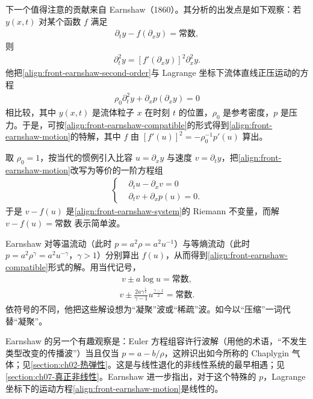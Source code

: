 \documentclass[../../main.tex]{subfiles}
\begin{document}
下一个值得注意的贡献来自 Earnshaw（1860）。其分析的出发点是如下观察：若 $y(x,t)$ 对某个函数 $f$ 满足
\begin{align}
\partial_t y-f(\partial_x y)=\text{常数},\label{align:front-earnshaw-compatible}
\end{align}
则
\begin{align}
\partial_t^{2}y=[f'(\partial_x y)]^{2}\partial_x^{2}y.\label{align:front-earnshaw-second-order}
\end{align}
他把\eqref{align:front-earnshaw-second-order}与 Lagrange 坐标下流体直线正压运动的方程
\begin{align}
\rho_0\partial_t^{2}y+\partial_x p(\partial_x y)=0\label{align:front-earnshaw-motion}
\end{align}
相比较，其中 $y(x,t)$ 是流体粒子 $x$ 在时刻 $t$ 的位置，$\rho_0$ 是参考密度，$p$ 是压力。于是，可按\eqref{align:front-earnshaw-compatible}的形式得到\eqref{align:front-earnshaw-motion}的特解，其中 $f$ 由 $[f'(u)]^{2}=-\rho_0^{-1}p'(u)$ 算出。

取 $\rho_0=1$，按当代的惯例引入比容 $u=\partial_x y$ 与速度 $v=\partial_t y$，把\eqref{align:front-earnshaw-motion}改写为等价的一阶方程组
\begin{align}
\left\{\begin{aligned}
&\partial_t u-\partial_x v=0\\
&\partial_t v+\partial_x p(u)=0.
\end{aligned}\right.\label{align:front-earnshaw-system}
\end{align}
于是 $v-f(u)$ 是\eqref{align:front-earnshaw-system}的 Riemann 不变量，而解 $v-f(u)=\text{常数}$ 表示简单波。

Earnshaw 对等温流动（此时 $p=a^{2}\rho=a^{2}u^{-1}$）与等熵流动（此时 $p=a^{2}\rho^{\gamma}=a^{2}u^{-\gamma}$，$\gamma>1$）分别算出 $f(u)$，从而得到\eqref{align:front-earnshaw-compatible}形式的解。用当代记号，
\begin{align}
v\pm a\log u=\text{常数},\label{align:front-earnshaw-isothermal}
\end{align}
\begin{align}
v\pm\frac{2a\gamma^{\frac{1}{2}}}{\gamma-1}u^{\frac{\gamma-1}{2}}=\text{常数}.\label{align:front-earnshaw-isentropic}
\end{align}
依符号的不同，他把这些解设想为“凝聚”波或“稀疏”波。如今以“压缩”一词代替“凝聚”。

Earnshaw 的另一个有趣观察是：Euler 方程组容许行波解（用他的术语，“不发生类型改变的传播波”）当且仅当 $p=a-b/\rho$，这辨识出如今所称的 Chaplygin 气体；见\cref{section:ch02-热弹性}。这是与线性退化的非线性系统的最早相遇；见\cref{section:ch07-真正非线性}。Earnshaw 进一步指出，对于这个特殊的 $p$，Lagrange 坐标下的运动方程\eqref{align:front-earnshaw-motion}是线性的。
\end{document}
